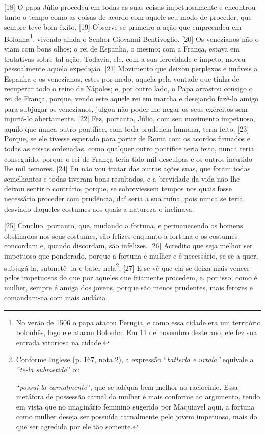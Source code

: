 {[}18{]} O papa Júlio  procedeu em todas as suas coisas impetuosamente
e encontrou tanto o tempo como as coisas de acordo com aquele seu modo
de proceder, que sempre teve bom êxito. {[}19{]} Observe-se primeiro a
ação que empreendeu em Bolonha\footnote{No verão de 1506 o papa atacou
  Perugia, e como essa cidade era um território bolonhês, logo ele
  atacou Bolonha. Em 11 de novembro deste ano, ele fez sua entrada
  vitoriosa na cidade.}, vivendo ainda o Senhor Giovanni Bentivoglio.
{[}20{]} Os venezianos não o viam com bons olhos; o rei de Espanha, o
mesmo; com a França, estava em tratativas sobre tal ação. Todavia, ele,
com a sua ferocidade e ímpeto, moveu pessoalmente aquela expedição.
{[}21{]} Movimento que deixou perplexos e imóveis a Espanha e os
venezianos, estes por medo, aquela pela vontade que tinha de recuperar
todo o reino de Nápoles; e, por outro lado, o Papa arrastou consigo o
rei de França, porque, vendo este aquele rei em marcha e desejando
fazê-lo amigo para subjugar os venezianos, julgou não poder lhe negar os
seus exércitos sem injuriá-lo abertamente. {[}22{]} Fez, portanto,
Júlio, com seu movimento impetuoso, aquilo que nunca outro pontífice,
com toda prudência humana, teria feito. {[}23{]} Porque, se ele tivesse
esperado para partir de Roma com os acordos firmados e todas as coisas
ordenadas, como qualquer outro pontífice teria feito, nunca teria
conseguido, porque o rei de França teria tido mil desculpas e os outros
incutido-lhe mil temores. {[}24{]} Eu não vou tratar das outras ações
suas, que foram todas semelhantes e todas tiveram bons resultados, e a
brevidade da vida não lhe deixou sentir o contrário, porque, se
sobreviessem tempos nos quais fosse necessário proceder com prudência,
daí seria a sua ruína, pois nunca se teria desviado daqueles costumes
aos quais a natureza o inclinava.

{[}25{]} Concluo, portanto, que, mudando a fortuna, e permanecendo os
homens obstinados nos seus costumes, são felizes enquanto a fortuna e os
costumes concordam e, quando discordam, são infelizes. {[}26{]} Acredito
que seja melhor ser impetuoso que ponderado, porque a fortuna é mulher e
é necessário, se se a quer, subjugá-la, submetê- la e bater
nela\footnote{Conforme Inglese (p. 167, nota 2), a expressão
  ``\emph{batterla e urtala''} equivale a \emph{``te-la submetida}'' ou

  ``\emph{possuí-la carnalmente}'', que se adéqua bem melhor ao
  raciocínio. Essa metáfora de possessão carnal da mulher é mais
  conforme ao argumento, tendo em vista que no imaginário feminino
  sugerido por Maquiavel aqui, a fortuna como mulher deseja ser possuída
  carnalmente pelo jovem impetuoso, mais do que ser agredida por ele tão
  somente.}. {[}27{]} E se vê que ela se deixa mais vencer pelos
impetuosos do que por aqueles que friamente procedem, e, por isso, como
é mulher, sempre é amiga dos jovens, porque são menos prudentes, mais
ferozes e comandam-na com mais audácia.

